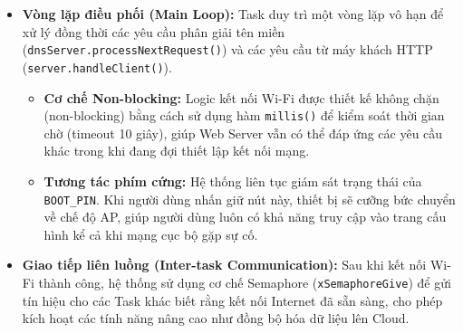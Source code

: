 \begin{itemize}
    \item \textbf{Vòng lặp điều phối (Main Loop):} Task duy trì một vòng lặp vô hạn để xử lý đồng thời các yêu cầu phân giải tên miền (\texttt{dnsServer.processNextRequest()}) và các yêu cầu từ máy khách HTTP (\texttt{server.handleClient()}).
    
    \begin{itemize}
        \item \textbf{Cơ chế Non-blocking:} Logic kết nối Wi-Fi được thiết kế không chặn (non-blocking) bằng cách sử dụng hàm \texttt{millis()} để kiểm soát thời gian chờ (timeout 10 giây), giúp Web Server vẫn có thể đáp ứng các yêu cầu khác trong khi đang đợi thiết lập kết nối mạng.
        \item \textbf{Tương tác phím cứng:} Hệ thống liên tục giám sát trạng thái của \texttt{BOOT\_PIN}. Khi người dùng nhấn giữ nút này, thiết bị sẽ cưỡng bức chuyển về chế độ AP, giúp người dùng luôn có khả năng truy cập vào trang cấu hình kể cả khi mạng cục bộ gặp sự cố.
    \end{itemize}

    \item \textbf{Giao tiếp liên luồng (Inter-task Communication):} Sau khi kết nối Wi-Fi thành công, hệ thống sử dụng cơ chế Semaphore (\texttt{xSemaphoreGive}) để gửi tín hiệu cho các Task khác biết rằng kết nối Internet đã sẵn sàng, cho phép kích hoạt các tính năng nâng cao như đồng bộ hóa dữ liệu lên Cloud.
\end{itemize}
